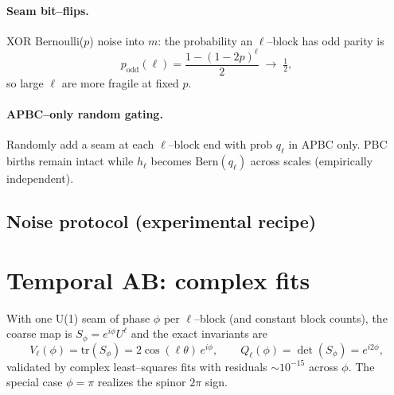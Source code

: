 \documentclass[11pt]{article}
\begin{document}
\paragraph{Seam bit--flips.}
XOR Bernoulli($p$) noise into $m$: the probability an $\ell$--block has odd parity is
\begin{equation}
p_{\mathrm{odd}}(\ell)=\frac{1-(1-2p)^\ell}{2}\;\to\;\tfrac12,
\end{equation}
so large $\ell$ are more fragile at fixed $p$.
\paragraph{APBC--only random gating.}
Randomly add a seam at each $\ell$--block end with prob $q_\ell$ in APBC only. PBC births remain intact while $h_\ell$ becomes $\mathrm{Bern}(q_\ell)$ across scales (empirically independent).

\subsection*{Noise protocol (experimental recipe)}\label{sec:noise-protocol}
\noindent{}

\section{Temporal AB: complex fits}\label{sec:ab}
With one U(1) seam of phase $\phi$ per $\ell$--block (and constant block counts), the coarse map is $S_\phi=e^{i\phi}U^\ell$ and the exact invariants are
\begin{equation}
V_\ell(\phi)=\mathrm{tr}(S_\phi)=2\cos(\ell\theta)\,e^{i\phi},\qquad
Q_\ell(\phi)=\det(S_\phi)=e^{i2\phi},
\end{equation}
validated by complex least--squares fits with residuals $\sim 10^{-15}$ across $\phi$. The special case $\phi=\pi$ realizes the spinor $2\pi$ sign.
\end{document}
